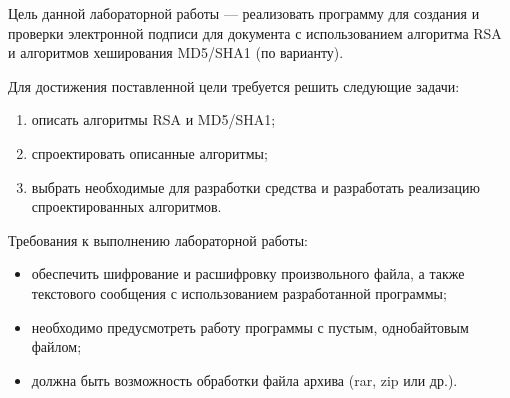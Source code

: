 
Цель данной лабораторной работы --- реализовать программу для создания и проверки электронной подписи для документа с использованием алгоритма RSA и алгоритмов хеширования MD5/SHA1 (по варианту).

Для достижения поставленной цели требуется решить следующие задачи:
\begin{enumerate}
	\item описать алгоритмы RSA и MD5/SHA1;
	\item спроектировать описанные алгоритмы;
	\item выбрать необходимые для разработки средства и разработать реализацию спроектированных алгоритмов.
\end{enumerate}

Требования к выполнению лабораторной работы:
\begin{itemize}
	\item обеспечить шифрование и расшифровку произвольного файла, а также текстового сообщения с использованием разработанной программы;
	\item необходимо предусмотреть работу программы с пустым, однобайтовым файлом;
	\item должна быть возможность обработки файла архива (rar, zip или др.).
\end{itemize}
